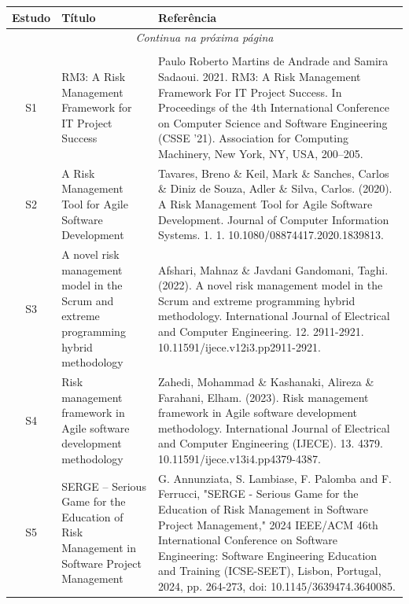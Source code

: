 \documentclass[
	12pt,
	openright,
	twoside,
	a4paper,
	english,
	brazil
	]{abntex2}
\begin{document}
\vspace{-2em} %

\begin{longtable}{|c|p{5.5cm}|p{7.5cm}|}
  \hline
  \textbf{Estudo} & \textbf{Título} & \textbf{Referência} \\
  \hline
  \endfirsthead
  \hline
  \multicolumn{3}{|c|}{\textit{Continua na próxima página}} \\
  \hline
  \endfoot
  \hline
  \multicolumn{3}{|c|}{\textit{Fim da tabela}} \\
  \hline
  \endlastfoot
  S1 & RM3: A Risk Management Framework for IT Project Success & Paulo Roberto Martins de Andrade and Samira Sadaoui. 2021. RM3: A Risk Management Framework For IT Project Success. In Proceedings of the 4th International Conference on Computer Science and Software Engineering (CSSE '21). Association for Computing Machinery, New York, NY, USA, 200–205. \\
  \hline
  S2 & A Risk Management Tool for Agile Software Development & Tavares, Breno \& Keil, Mark \& Sanches, Carlos \& Diniz de Souza, Adler \& Silva, Carlos. (2020). A Risk Management Tool for Agile Software Development. Journal of Computer Information Systems. 1. 1. 10.1080/08874417.2020.1839813. \\
  \hline
  S3 & A novel risk management model in the Scrum and extreme programming hybrid methodology & Afshari, Mahnaz \& Javdani Gandomani, Taghi. (2022). A novel risk management model in the Scrum and extreme programming hybrid methodology. International Journal of Electrical and Computer Engineering. 12. 2911-2921. 10.11591/ijece.v12i3.pp2911-2921. \\
  \hline
  S4 & Risk management framework in Agile software development methodology & Zahedi, Mohammad \& Kashanaki, Alireza \& Farahani, Elham. (2023). Risk management framework in Agile software development methodology. International Journal of Electrical and Computer Engineering (IJECE). 13. 4379. 10.11591/ijece.v13i4.pp4379-4387. \\
  \hline
  S5 & SERGE – Serious Game for the Education of Risk Management in Software Project Management & G. Annunziata, S. Lambiase, F. Palomba and F. Ferrucci, "SERGE - Serious Game for the Education of Risk Management in Software Project Management," 2024 IEEE/ACM 46th International Conference on Software Engineering: Software Engineering Education and Training (ICSE-SEET), Lisbon, Portugal, 2024, pp. 264-273, doi: 10.1145/3639474.3640085. \\

\end{longtable}
\end{document}
